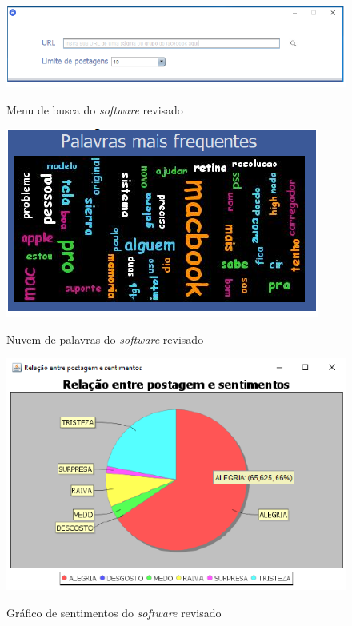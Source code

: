 \begin{figure}[!h]
\centering 
\caption{Menu de busca do \textit{software} revisado}
\includegraphics[scale=0.5]{imagens/menudebuscafilipe.png}
\label{fig:menutccfilipe}
\end{figure}

\begin{figure}[!h]
\centering 
\caption{Nuvem de palavras do \textit{software} revisado}
\includegraphics[scale=0.62]{imagens/nuvemdepalavras.png}
\label{fig:nuvemtccfilipe}
\end{figure}

\begin{figure}[!h]
\centering 
\caption{Gráfico de sentimentos do \textit{software} revisado}
\includegraphics[scale=0.8]{imagens/graficodesentimentosfilipe.png}
\label{fig:graficotccfilipe}
\end{figure}

